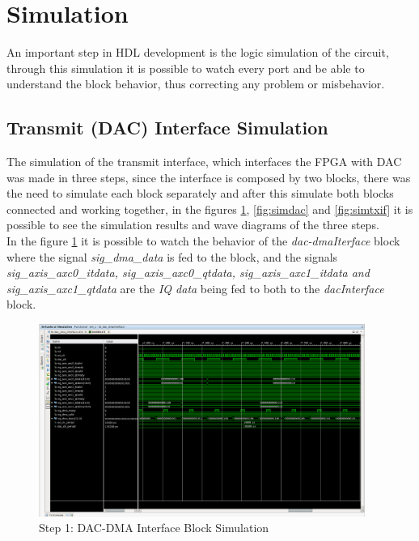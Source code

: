 \vfill
\clearpage

\section{Simulation}

An important step in HDL development is the logic simulation of the circuit,
through this simulation it is possible to watch every port and be able to
understand the block behavior, thus correcting any problem or misbehavior.\\

\subsection{Transmit (DAC) Interface Simulation}

The simulation of the transmit interface, which interfaces the FPGA with DAC was
made in three steps, since the interface is composed by two blocks, there was
the need to simulate each block separately and after this simulate both blocks
connected and working together, in the figures \ref{fig:simdacdma},
\ref{fig:simdac} and \ref{fig:simtxif} it is possible to see the simulation
results and wave diagrams of the three steps.\\

In the figure \ref{fig:simdacdma} it is possible to watch the behavior of the
\textit{dac-dmaIterface} block where the signal \textit{sig\_dma\_data} is fed to
the block, and the signals \textit{ sig\_axis\_axc0\_itdata, sig\_axis\_axc0\_qtdata,
sig\_axis\_axc1\_itdata and sig\_axis\_axc1\_qtdata} are the \textit{IQ data} being
fed to both to the \textit{dacInterface} block.\\

\begin{figure}[htbp]
    \centering
    \includegraphics[width=0.95\textwidth]{./figures/dac_dmaInterface}
    \caption{ Step 1: DAC-DMA Interface Block Simulation
    \label{fig:simdacdma}}
\end{figure}

